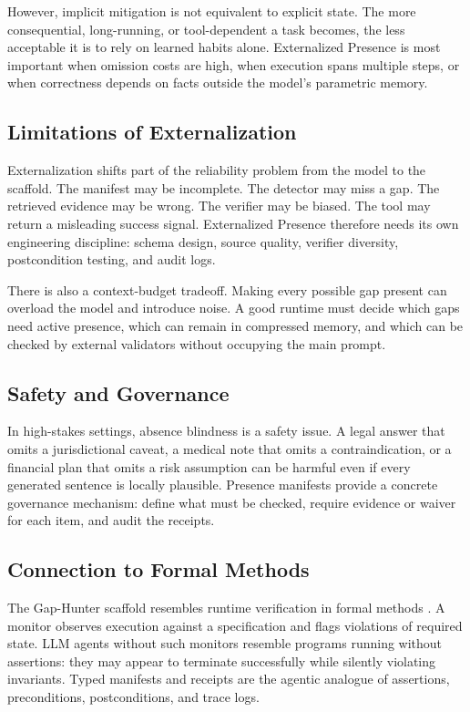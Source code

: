 \documentclass[10pt,conference]{IEEEtran}
\begin{document}
However, implicit mitigation is not equivalent to explicit state. The more consequential, long-running, or tool-dependent a task becomes, the less acceptable it is to rely on learned habits alone. Externalized Presence is most important when omission costs are high, when execution spans multiple steps, or when correctness depends on facts outside the model's parametric memory.

\subsection{Limitations of Externalization}
Externalization shifts part of the reliability problem from the model to the scaffold. The manifest may be incomplete. The detector may miss a gap. The retrieved evidence may be wrong. The verifier may be biased. The tool may return a misleading success signal. Externalized Presence therefore needs its own engineering discipline: schema design, source quality, verifier diversity, postcondition testing, and audit logs.

There is also a context-budget tradeoff. Making every possible gap present can overload the model and introduce noise. A good runtime must decide which gaps need active presence, which can remain in compressed memory, and which can be checked by external validators without occupying the main prompt.

\subsection{Safety and Governance}
In high-stakes settings, absence blindness is a safety issue. A legal answer that omits a jurisdictional caveat, a medical note that omits a contraindication, or a financial plan that omits a risk assumption can be harmful even if every generated sentence is locally plausible. Presence manifests provide a concrete governance mechanism: define what must be checked, require evidence or waiver for each item, and audit the receipts.

\subsection{Connection to Formal Methods}
The Gap-Hunter scaffold resembles runtime verification in formal methods \cite{li2024formal}. A monitor observes execution against a specification and flags violations of required state. LLM agents without such monitors resemble programs running without assertions: they may appear to terminate successfully while silently violating invariants. Typed manifests and receipts are the agentic analogue of assertions, preconditions, postconditions, and trace logs.
\end{document}
